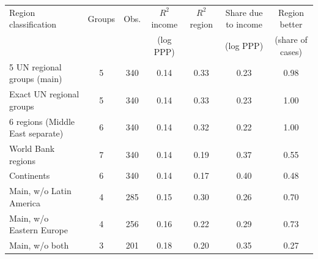 \begin{tabular}{lcccccc}
\toprule
Region classification & Groups & Obs. & $R^2$ income & $R^2$ region & Share due to income & Region better \\ & & & (log PPP) & & (log PPP) & (share of cases) \\
\midrule
5 UN regional groups (main) & 5 & 340 & 0.14 & 0.33 & 0.23 & 0.98 \\
Exact UN regional groups & 5 & 340 & 0.14 & 0.33 & 0.23 & 1.00 \\
6 regions (Middle East separate) & 6 & 340 & 0.14 & 0.32 & 0.22 & 1.00 \\
World Bank regions & 7 & 340 & 0.14 & 0.19 & 0.37 & 0.55 \\
Continents & 6 & 340 & 0.14 & 0.17 & 0.40 & 0.48 \\
\midrule
Main, w/o Latin America & 4 & 285 & 0.15 & 0.30 & 0.26 & 0.70 \\
Main, w/o Eastern Europe & 4 & 256 & 0.16 & 0.22 & 0.29 & 0.73 \\
Main, w/o both & 3 & 201 & 0.18 & 0.20 & 0.35 & 0.27 \\
\bottomrule
\end{tabular}
